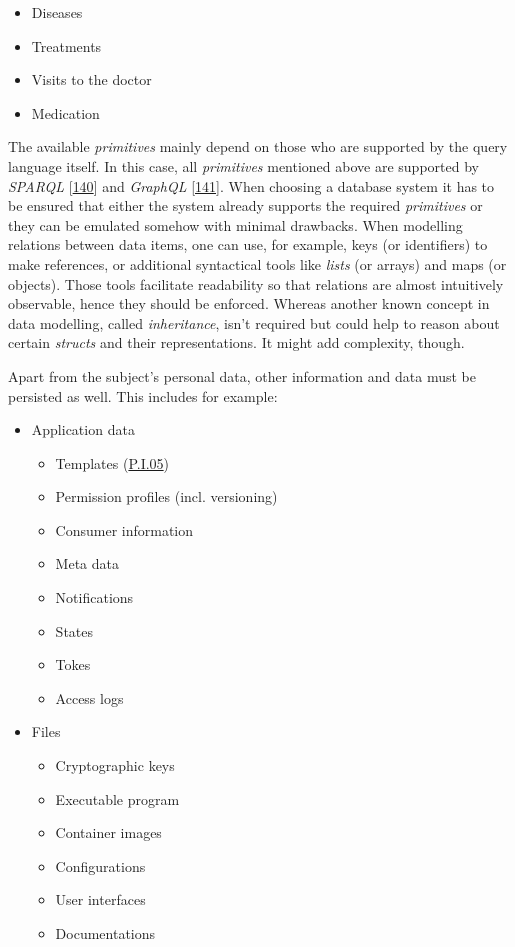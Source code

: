 \documentclass[12pt,english,a4paper,titlepage,cleardoublepage=empty,dottedtoc]{report}
\providecommand{\tightlist}{%
  \setlength{\itemsep}{0pt}\setlength{\parskip}{0pt}}
\begin{document}
\begin{itemize}
  \begin{itemize}
  \tightlist
  \item
    Diseases
  \item
    Treatments
  \item
    Visits to the doctor
  \item
    Medication
  \end{itemize}
\end{itemize}

The available \emph{primitives} mainly depend on those who are supported
by the query language itself. In this case, all \emph{primitives}
mentioned above are supported by \emph{SPARQL}
{[}\protect\hyperlink{ref-web_spec_xml_types}{140}{]} and \emph{GraphQL}
{[}\protect\hyperlink{ref-web_spec_graphql_types}{141}{]}. When choosing
a database system it has to be ensured that either the system already
supports the required \emph{primitives} or they can be emulated somehow
with minimal drawbacks. When modelling relations between data items, one
can use, for example, keys (or identifiers) to make references, or
additional syntactical tools like \emph{lists} (or arrays) and maps (or
objects). Those tools facilitate readability so that relations are
almost intuitively observable, hence they should be enforced. Whereas
another known concept in data modelling, called \emph{inheritance},
isn't required but could help to reason about certain \emph{structs} and
their representations. It might add complexity, though.

Apart from the subject's personal data, other information and data must
be persisted as well. This includes for example:

\begin{itemize}
\tightlist
\item
  Application data

  \begin{itemize}
  \tightlist
  \item
    Templates (\protect\hyperlink{pi05}{P.I.05})
  \item
    Permission profiles (incl. versioning)
  \item
    Consumer information
  \item
    Meta data
  \item
    Notifications
  \item
    States
  \item
    Tokes
  \item
    Access logs
  \end{itemize}
\item
  Files

  \begin{itemize}
  \tightlist
  \item
    Cryptographic keys
  \item
    Executable program
  \item
    Container images
  \item
    Configurations
  \item
    User interfaces
  \item
    Documentations
  \end{itemize}
\end{itemize}
\end{document}
